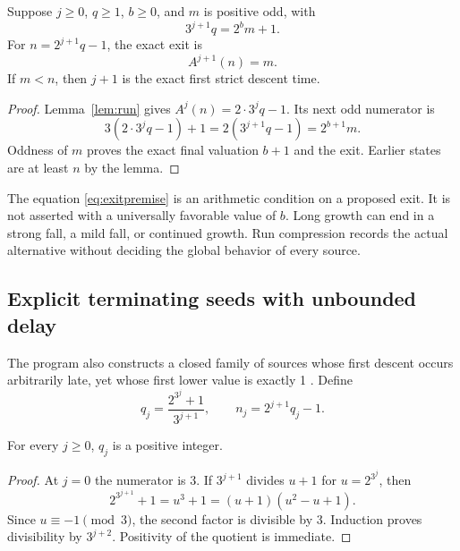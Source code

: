 \begin{theorem}\label{thm:exit}
Suppose $j\ge0$, $q\ge1$, $b\ge0$, and $m$ is positive odd, with
\begin{equation}\label{eq:exitpremise}
3^{j+1}q=2^b m+1.
\end{equation}
For $n=2^{j+1}q-1$, the exact exit is
\begin{equation}\label{eq:exit}
A^{j+1}(n)=m.
\end{equation}
If $m<n$, then $j+1$ is the exact first strict descent time.
\end{theorem}
\begin{proof}
Lemma~\ref{lem:run} gives $A^j(n)=2\cdot3^j q-1$. Its next odd numerator is
\[
3(2\cdot3^j q-1)+1=2(3^{j+1}q-1)=2^{b+1}m.
\]
Oddness of $m$ proves the exact final valuation $b+1$ and the exit. Earlier states are at least $n$ by the lemma.
\end{proof}

The equation \eqref{eq:exitpremise} is an arithmetic condition on a proposed exit. It is not asserted with a universally favorable value of $b$. Long growth can end in a strong fall, a mild fall, or continued growth. Run compression records the actual alternative without deciding the global behavior of every source.

\subsection{Explicit terminating seeds with unbounded delay}
The program also constructs a closed family of sources whose first descent occurs arbitrarily late, yet whose first lower value is exactly 1 \cite{projectcollatzseeds}. Define
\begin{equation}\label{eq:seeds}
q_j=\frac{2^{3^j}+1}{3^{j+1}},\qquad n_j=2^{j+1}q_j-1.
\end{equation}

\begin{lemma}\label{lem:seeddiv}
For every $j\ge0$, $q_j$ is a positive integer.
\end{lemma}
\begin{proof}
At $j=0$ the numerator is 3. If $3^{j+1}$ divides $u+1$ for $u=2^{3^j}$, then
\[
2^{3^{j+1}}+1=u^3+1=(u+1)(u^2-u+1).
\]
Since $u\equiv-1\pmod3$, the second factor is divisible by 3. Induction proves divisibility by $3^{j+2}$. Positivity of the quotient is immediate.
\end{proof}

